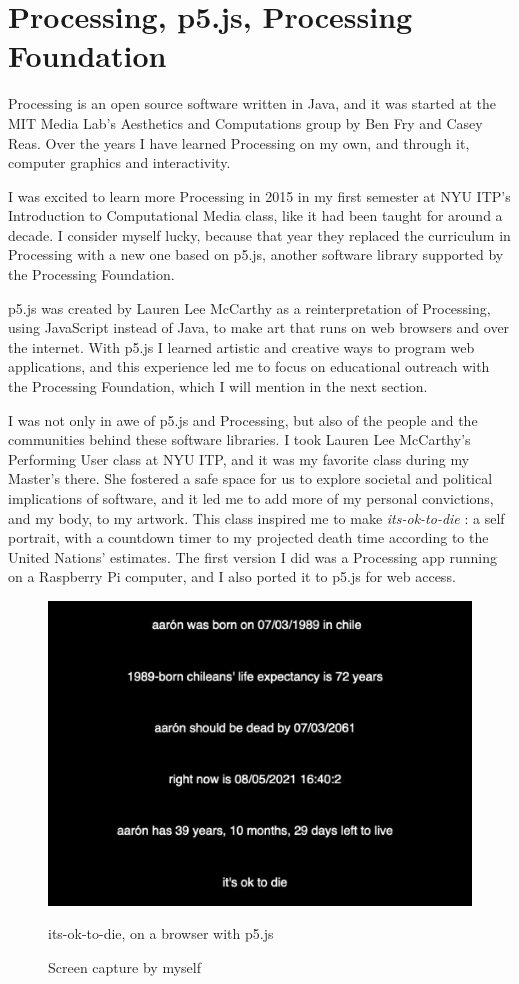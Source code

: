 \section{Processing, p5.js, Processing Foundation}

Processing \cite{website-processing} is an open source software written in Java, and it was started at the MIT Media Lab's Aesthetics and Computations group by Ben Fry and Casey Reas. Over the years I have learned Processing on my own, and through it, computer graphics and interactivity.

I was excited to learn more Processing in 2015 in my first semester at \acrshort{NYU} \acrshort{ITP}'s Introduction to Computational Media class, like it had been taught for around a decade. I consider myself lucky, because that year they replaced the curriculum in Processing with a new one based on p5.js, another software library supported by the Processing Foundation.

p5.js was created by Lauren Lee McCarthy \cite{website-lauren-lee-mccarthy} as a reinterpretation of Processing, using JavaScript instead of Java, to make art that runs on web browsers and over the internet. With p5.js I learned artistic and creative ways to program web applications, and this experience led me to focus on educational outreach with the Processing Foundation, which I will mention in the next section.

I was not only in awe of p5.js and Processing, but also of the people and the communities behind these software libraries. I took Lauren Lee McCarthy's Performing User class \cite{website-nyu-itp-lauren-mccarthy-performing-user} at \acrshort{NYU} \acrshort{ITP}, and it was my favorite class during my Master's there. She fostered a safe space for us to explore societal and political implications of software, and it led me to add more of my personal convictions, and my body, to my artwork. This class inspired me to make \emph{its-ok-to-die} \cite{its-ok-to-die}: a self portrait, with a countdown timer to my projected death time according to the United Nations' estimates. The first version I did was a Processing app running on a Raspberry Pi computer, and I also ported it to p5.js for web access.

\begin{figure}[ht]
  \centering
  \includegraphics[width=0.75\linewidth,height=0.35\textheight,keepaspectratio]{images/its-ok-to-die-p5js.jpg}
  \caption{its-ok-to-die, on a browser with p5.js}
  \caption*{Screen capture by myself}
  \label{fig:its-ok-to-die-p5js}
\end{figure}

